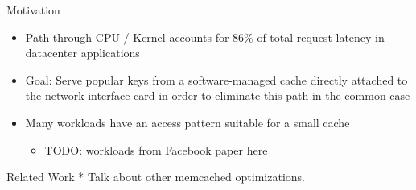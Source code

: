 \begin{block}{Motivation}
    \begin{itemize}
        \item Path through CPU / Kernel accounts for 86\% of total request latency in datacenter applications
        \item Goal: Serve popular keys from a software-managed cache directly attached to the network interface card in order to eliminate this path in the common case
        \item Many workloads have an access pattern suitable for a small cache
            \begin{itemize}
                \item TODO: workloads from Facebook paper here
            \end{itemize}

    \end{itemize}    

\end{block}

\vspace{1ex}

\begin{block}{Related Work}
* Talk about other memcached optimizations.


\end{block}
